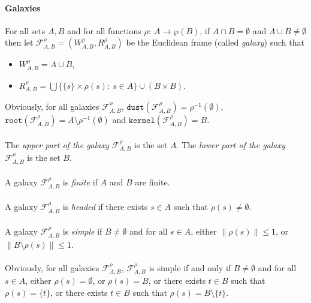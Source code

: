 \documentclass[draft]{article}
\def\dust{\mathtt{dust}}
\def\kernel{\mathtt{kernel}}
\def\root{\mathtt{root}}
\begin{document}
\paragraph{Galaxies}
%
%
For all sets $A,B$ and for all functions $\rho:\ A{\longrightarrow}\wp(B)$, if $A{\cap}B{=}\emptyset$ and $A{\cup}B{\not=}\emptyset$ then let ${\mathcal F}_{A,B}^{\rho}{=}(W_{A,B}^{\rho},R_{A,B}^{\rho})$ be the Euclidean frame (called {\it galaxy}) such that
%
%
\begin{itemize}
%
%
\item $W_{A,B}^{\rho}{=}A{\cup}B$,
%
%
\item $R_{A,B}^{\rho}{=}\bigcup\{\{s\}{\times}\rho(s):\ s{\in}A\}{\cup}(B{\times}B)$.
%
%
\end{itemize}
%
%
Obviously, for all galaxies ${\mathcal F}_{A,B}^{\rho}$, $\dust({\mathcal F}_{A,B}^{\rho}){=}\rho^{{-}1}(\emptyset)$, $\root({\mathcal F}_{A,B}^{\rho}){=}A{\setminus}\rho^{{-}1}(\emptyset)$ and $\kernel({\mathcal F}_{A,B}^{\rho}){=}B$.
%
%
\\
\\
%
%
The {\it upper part of the galaxy ${\mathcal F}_{A,B}^{\rho}$}\/ is the set $A$.
The {\it lower part of the galaxy ${\mathcal F}_{A,B}^{\rho}$}\/ is the set $B$.
%
%
\\
\\
%
%
A galaxy ${\mathcal F}_{A,B}^{\rho}$ is {\it finite}\/ if $A$ and $B$ are finite.
%
%
\\
\\
%
%
A galaxy ${\mathcal F}_{A,B}^{\rho}$ is {\it headed}\/ if there exists $s{\in}A$ such that $\rho(s){\not=}\emptyset$.
%
%
\\
\\
%
%
A galaxy ${\mathcal F}_{A,B}^{\rho}$ is {\it simple}\/ if $B{\not=}\emptyset$ and for all $s{\in}A$, either ${\parallel}\rho(s){\parallel}{\leq}1$, or ${\parallel}B{\setminus}\rho(s){\parallel}{\leq}
%
%
%
%
%
%
%
%
%
%
%
%
$\linebreak$
%
%
%
%
%
%
%
%
%
%
%
%
1$.
%
%
\\
\\
%
%
Obviously, for all galaxies ${\mathcal F}_{A,B}^{\rho}$, ${\mathcal F}_{A,B}^{\rho}$ is simple if and only if $B{\not=}\emptyset$ and for all $s{\in}A$, either $\rho(s){=}\emptyset$, or $\rho(s){=}B$, or there exists $t{\in}B$ such that $\rho(s){=}\{t\}$, or there exists $t{\in}B$ such that $\rho(s){=}B{\setminus}\{t\}$.
%
%
\end{document}
